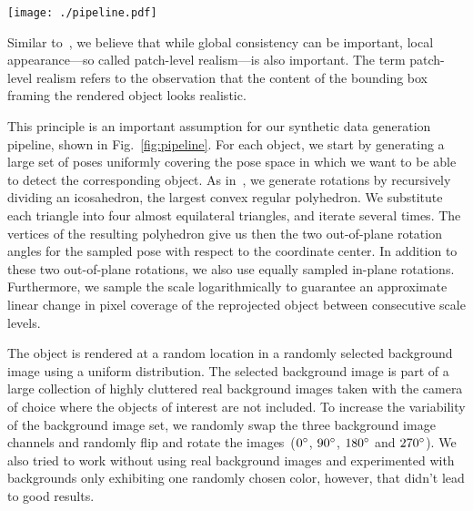 \documentclass[10pt,twocolumn,letterpaper]{article}
\begin{document}
\begin{figure*}[ht]
\begin{center}
\texttt{[image: ./pipeline.pdf]} 
\end{center}
\caption{\label{fig:pipeline} Our synthetic data  generation pipeline.  For each
  generated 3D  pose and object, we  render the object over  a randomly selected
  cluttered   background  image   using  OpenGL   and  the   Phong  illumination
  model~\cite{Phong75}.  We use randomly perturbed light color for rendering and
  add image noise to the rendering.  Finally, we blur the object with a Gaussian
  filter. We also compute a tightly  fitting bounding box using the object's CAD
  model and the corresponding pose.}

\end{figure*}


Similar to~\cite{Dwibedi17},  we believe  that while  global consistency  can be
important, local appearance---so called patch-level realism---is also important.
The term patch-level  realism refers to the observation that  the content of the
bounding box framing the rendered object  looks realistic.

This  principle is  an important  assumption for  our synthetic  data generation
pipeline,  shown  in Fig.~\ref{fig:pipeline}.   For  each  object, we  start  by
generating a large  set of poses uniformly  covering the pose space  in which we
want    to    be   able    to    detect    the   corresponding    object.     As
in~\cite{Hinterstoisser12b}, we  generate rotations  by recursively  dividing an
icosahedron, the largest convex regular polyhedron.  We substitute each triangle
into four almost equilateral triangles, and iterate several times.  The vertices
of the  resulting polyhedron give us  then the two out-of-plane  rotation angles
for the  sampled pose  with respect  to the coordinate  center.  In  addition to
these  two  out-of-plane  rotations,  we   also  use  equally  sampled  in-plane
rotations.
Furthermore, we  sample the  scale logarithmically  to guarantee  an approximate
linear change  in pixel coverage  of the reprojected object  between consecutive
scale levels. 

The object is rendered at a random location in a randomly selected
background image using a uniform  distribution. The selected background image is
part of  a large collection  of highly cluttered real  background images taken
with the camera  of choice where the objects  of interest are
not included.
To increase  the variability of the  background image set, we  randomly swap the
three   background   image  channels   and   randomly   flip  and   rotate   the
images~($0\degree$, $90\degree$,  $180\degree$ and $270\degree$).  
We also tried to work without using real background images 
and experimented with backgrounds only exhibiting one randomly chosen color, however,
that didn't lead to good results.
\end{document}
